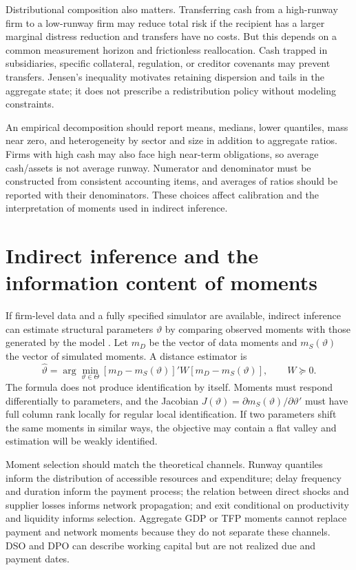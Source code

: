 \documentclass[11pt,a4paper]{article}
\begin{document}
Distributional composition also matters. Transferring cash from a high-runway firm to a low-runway firm may reduce total risk if the recipient has a larger marginal distress reduction and transfers have no costs. But this depends on a common measurement horizon and frictionless reallocation. Cash trapped in subsidiaries, specific collateral, regulation, or creditor covenants may prevent transfers. Jensen's inequality motivates retaining dispersion and tails in the aggregate state; it does not prescribe a redistribution policy without modeling constraints.

An empirical decomposition should report means, medians, lower quantiles, mass near zero, and heterogeneity by sector and size in addition to aggregate ratios. Firms with high cash may also face high near-term obligations, so average cash/assets is not average runway. Numerator and denominator must be constructed from consistent accounting items, and averages of ratios should be reported with their denominators. These choices affect calibration and the interpretation of moments used in indirect inference.

\section{Indirect inference and the information content of moments}
If firm-level data and a fully specified simulator are available, indirect inference can estimate structural parameters $\vartheta$ by comparing observed moments with those generated by the model \citep{gourieroux1993}. Let $m_D$ be the vector of data moments and $m_S(\vartheta)$ the vector of simulated moments. A distance estimator is
\begin{equation}
\widehat\vartheta=\arg\min_{\vartheta\in\Theta}[m_D-m_S(\vartheta)]'W[m_D-m_S(\vartheta)],\qquad W\succeq0. \label{eq:indirect}
\end{equation}
The formula does not produce identification by itself. Moments must respond differentially to parameters, and the Jacobian $J(\vartheta)=\partial m_S(\vartheta)/\partial\vartheta'$ must have full column rank locally for regular local identification. If two parameters shift the same moments in similar ways, the objective may contain a flat valley and estimation will be weakly identified.

Moment selection should match the theoretical channels. Runway quantiles inform the distribution of accessible resources and expenditure; delay frequency and duration inform the payment process; the relation between direct shocks and supplier losses informs network propagation; and exit conditional on productivity and liquidity informs selection. Aggregate GDP or TFP moments cannot replace payment and network moments because they do not separate these channels. DSO and DPO can describe working capital but are not realized due and payment dates.
\end{document}
